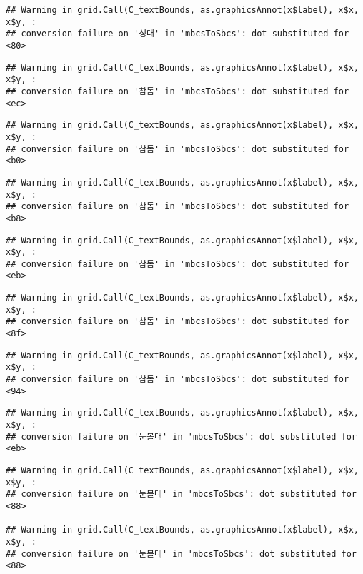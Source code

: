 \documentclass[
]{article}
\begin{document}
\begin{verbatim}
## Warning in grid.Call(C_textBounds, as.graphicsAnnot(x$label), x$x, x$y, :
## conversion failure on '성대' in 'mbcsToSbcs': dot substituted for <80>
\end{verbatim}

\begin{verbatim}
## Warning in grid.Call(C_textBounds, as.graphicsAnnot(x$label), x$x, x$y, :
## conversion failure on '참돔' in 'mbcsToSbcs': dot substituted for <ec>
\end{verbatim}

\begin{verbatim}
## Warning in grid.Call(C_textBounds, as.graphicsAnnot(x$label), x$x, x$y, :
## conversion failure on '참돔' in 'mbcsToSbcs': dot substituted for <b0>
\end{verbatim}

\begin{verbatim}
## Warning in grid.Call(C_textBounds, as.graphicsAnnot(x$label), x$x, x$y, :
## conversion failure on '참돔' in 'mbcsToSbcs': dot substituted for <b8>
\end{verbatim}

\begin{verbatim}
## Warning in grid.Call(C_textBounds, as.graphicsAnnot(x$label), x$x, x$y, :
## conversion failure on '참돔' in 'mbcsToSbcs': dot substituted for <eb>
\end{verbatim}

\begin{verbatim}
## Warning in grid.Call(C_textBounds, as.graphicsAnnot(x$label), x$x, x$y, :
## conversion failure on '참돔' in 'mbcsToSbcs': dot substituted for <8f>
\end{verbatim}

\begin{verbatim}
## Warning in grid.Call(C_textBounds, as.graphicsAnnot(x$label), x$x, x$y, :
## conversion failure on '참돔' in 'mbcsToSbcs': dot substituted for <94>
\end{verbatim}

\begin{verbatim}
## Warning in grid.Call(C_textBounds, as.graphicsAnnot(x$label), x$x, x$y, :
## conversion failure on '눈볼대' in 'mbcsToSbcs': dot substituted for <eb>
\end{verbatim}

\begin{verbatim}
## Warning in grid.Call(C_textBounds, as.graphicsAnnot(x$label), x$x, x$y, :
## conversion failure on '눈볼대' in 'mbcsToSbcs': dot substituted for <88>

## Warning in grid.Call(C_textBounds, as.graphicsAnnot(x$label), x$x, x$y, :
## conversion failure on '눈볼대' in 'mbcsToSbcs': dot substituted for <88>
\end{verbatim}
\end{document}
